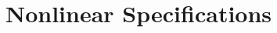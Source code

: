 \documentclass[11pt]{paper}
\begin{document}
\section{Nonlinear Specifications}


%
%
%
%
%
%
%
%
\end{document}
